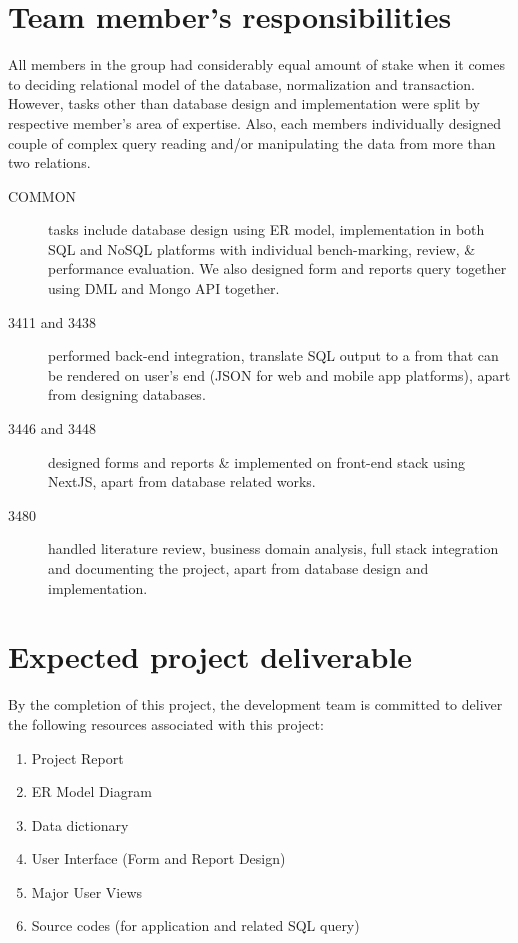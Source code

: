 
\section[Team member's responsibilities]{Team member's responsibilities}

All members in the group had considerably equal amount of stake when it comes to deciding relational model of the database, normalization and transaction. However, tasks other than database design and implementation were split by respective member's area of expertise. Also, each members individually designed couple of complex query reading and/or manipulating the data from more than two relations.

\begin{description}
	\item[COMMON] tasks include database design using ER model, implementation in both SQL and NoSQL platforms with individual bench-marking, review, \& performance evaluation. We also designed form and reports query together using DML and Mongo API together.
	\item[3411 and 3438] performed back-end integration, translate SQL output to a from that can be rendered on user's end (JSON for web and mobile app platforms), apart from designing databases.	
	\item[3446 and 3448] designed forms and reports \& implemented on front-end stack using NextJS, apart from database related works.
	\item[3480] handled literature review, business domain analysis, full stack integration and documenting the project, apart from database design and implementation.
\end{description}

\section[Project deliverable]{Expected project deliverable}

By the completion of this project, the development team is committed to deliver the following resources associated with this project:

\begin{enumerate}
	\item Project Report
	\item ER Model Diagram
	\item Data dictionary
	\item User Interface (Form and Report Design)
	\item Major User Views
	\item Source codes (for application and related SQL query)
\end{enumerate}

\clearpage
